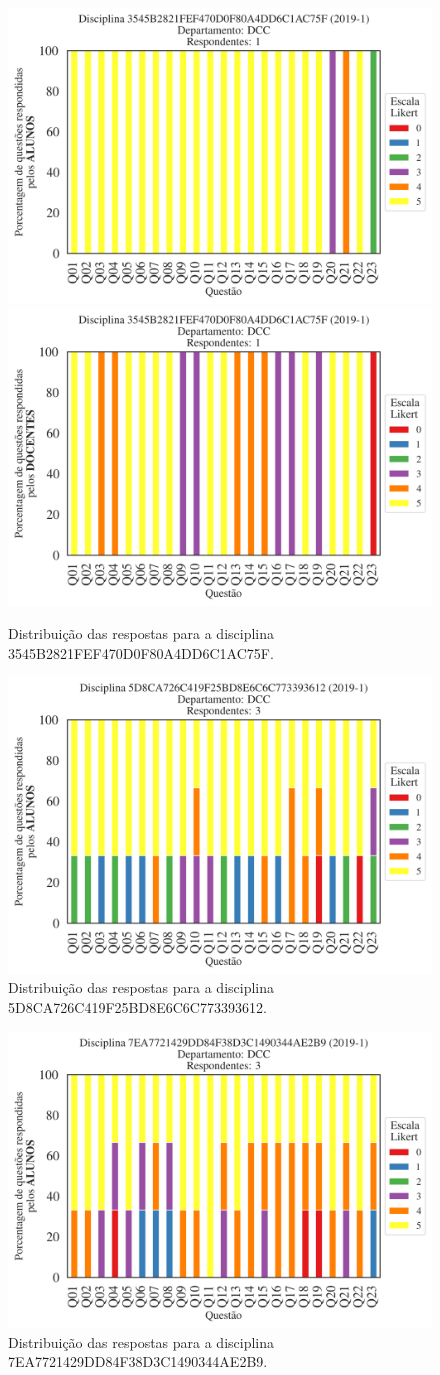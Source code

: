 \documentclass[a4paper,10pt]{article}
\begin{document}
\begin{figure}[h]
\centering
\includegraphics[width=0.485\linewidth]{analise_disciplina_departamento_DCC_ALUNO_TURMA_3545B2821FEF470D0F80A4DD6C1AC75F.png}
\includegraphics[width=0.485\linewidth]{analise_disciplina_departamento_DCC_DOCENTE_TURMA_3545B2821FEF470D0F80A4DD6C1AC75F.png}
\caption{\label{fig:analise_geral_departamento}                Distribuição das respostas para a disciplina 3545B2821FEF470D0F80A4DD6C1AC75F.}
\end{figure}
\begin{figure}[h]
\centering
\includegraphics[width=0.485\linewidth]{analise_disciplina_departamento_DCC_ALUNO_TURMA_5D8CA726C419F25BD8E6C6C773393612.png}
\caption{\label{fig:analise_geral_departamento}                Distribuição das respostas para a disciplina 5D8CA726C419F25BD8E6C6C773393612.}
\end{figure}
\begin{figure}[h]
\centering
\includegraphics[width=0.485\linewidth]{analise_disciplina_departamento_DCC_ALUNO_TURMA_7EA7721429DD84F38D3C1490344AE2B9.png}
\caption{\label{fig:analise_geral_departamento}                Distribuição das respostas para a disciplina 7EA7721429DD84F38D3C1490344AE2B9.}
\end{figure}
\end{document}
